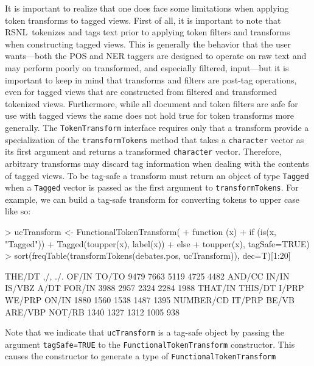 \documentclass[11pt]{article}
\def\RSNL{{\normalfont\fontseries{b}\selectfont RSNL}}
\let\code=\texttt
\let\rclass=\texttt
\begin{document}
It is important to realize that one does face some limitations when
applying token transforms to tagged views.  First of all, it is
important to note that \RSNL\ tokenizes and tags text prior to
applying token filters and transforms when constructing tagged views.
This is generally the behavior that the user wants---both the POS and
NER taggers are designed to operate on raw text and may perform poorly
on transformed, and especially filtered, input---but it is important
to keep in mind that transforms and filters are post-tag operations,
even for tagged views that are constructed from filtered and
transformed tokenized views.  Furthermore, while all document and
token filters are safe for use with tagged views the same does not
hold true for token transforms more generally.  The
\rclass{TokenTransform} interface requires only that a transform
provide a specialization of the \code{transformTokens} method that
takes a \code{character} vector as its first argument and returns a
transformed \code{character} vector.  Therefore, arbitrary transforms
may discard tag information when dealing with the contents of tagged
views.  To be tag-safe a transform must return an object of type
\rclass{Tagged} when a \rclass{Tagged} vector is passed as the first
argument to \code{transformTokens}.  For example, we can build a
tag-safe transform for converting tokens to upper case like so:
\begin{Schunk}
\begin{Sinput}
> ucTransform <- FunctionalTokenTransform(
+   function (x)
+     if (is(x, "Tagged"))
+       Tagged(toupper(x), label(x))
+     else
+       toupper(x), tagSafe=TRUE)
> sort(freqTable(transformTokens(debates.pos, ucTransform)), dec=T)[1:20]
\end{Sinput}
\begin{Soutput}
   THE/DT       ,/,       ./.     OF/IN     TO/TO 
     9479      7663      5119      4725      4482 
   AND/CC     IN/IN    IS/VBZ      A/DT    FOR/IN 
     3988      2957      2324      2284      1988 
  THAT/IN   THIS/DT     I/PRP    WE/PRP     ON/IN 
     1880      1560      1538      1487      1395 
NUMBER/CD    IT/PRP     BE/VB   ARE/VBP    NOT/RB 
     1340      1327      1312      1005       938 
\end{Soutput}
\end{Schunk}
Note that we indicate that \code{ucTransform} is a tag-safe object by
passing the argument \code{tagSafe=TRUE} to the
\rclass{FunctionalTokenTransform} constructor.  This causes the
constructor to generate a type of \rclass{FunctionalTokenTransform}
\end{document}

